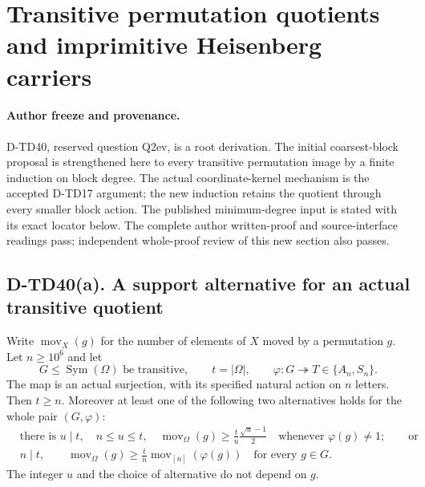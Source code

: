 \section{Transitive permutation quotients and imprimitive Heisenberg carriers}
\label{sec:heisenberg-permutation-carrier}

\paragraph{Author freeze and provenance.}
D-TD40, reserved question Q2ev, is a root derivation.
The initial coarsest-block proposal is strengthened here to every
transitive permutation image by a finite induction on block degree.
The actual coordinate-kernel mechanism is the accepted D-TD17
argument; the new induction retains the quotient through every
smaller block action.  The published minimum-degree input is stated
with its exact locator below.  The complete author written-proof
and source-interface readings pass; independent whole-proof review
of this new section also passes.

\subsection*{D-TD40(a). A support alternative for an actual transitive quotient}

Write $\operatorname{mov}_X(g)$ for the number of elements of $X$
moved by a permutation $g$.  Let $n\ge10^6$ and let
\[
 G\le\operatorname{Sym}(\Omega)\text{ be transitive},\qquad
 t=|\Omega|,\qquad
 \varphi:G\twoheadrightarrow T\in\{A_n,S_n\}.
 \tag{TPC.1}
\]
The map is an actual surjection, with its specified natural action
on $n$ letters.  Then $t\ge n$.  Moreover at least one of the
following two alternatives holds for the whole pair $(G,\varphi)$:
\[
 \begin{split}
 &\text{there is }u\mid t,\quad n\le u\le t,\quad
 \operatorname{mov}_{\Omega}(g)
       \ge\frac{t}{u}\frac{\sqrt u-1}{2}
       \quad\text{whenever }\varphi(g)\ne1; \qquad\text{or}\\
 &n\mid t,\qquad
 \operatorname{mov}_{\Omega}(g)
       \ge\frac{t}{n}\operatorname{mov}_{[n]}(\varphi(g))
       \quad\text{for every }g\in G.
 \end{split}
 \tag{TPC.2}
\]
The integer $u$ and the choice of alternative do not depend on $g$.

